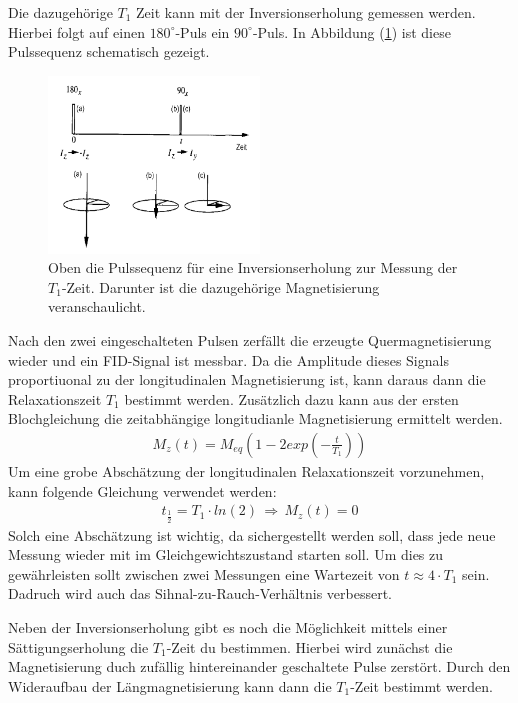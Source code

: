 Die dazugeh\"{o}rige $T_1$ Zeit kann mit der Inversionserholung gemessen werden.
Hierbei folgt auf einen $180^{\circ}$-Puls ein $90^{\circ}$-Puls.
In Abbildung (\ref{inversion}) ist diese Pulssequenz schematisch gezeigt.
\begin{figure}
	\centering
	\includegraphics[width=0.5\textwidth]{Plots/inversionserholung.png}
	\caption{Oben die Pulssequenz f\"{u}r eine Inversionserholung zur Messung der $T_1$-Zeit. Darunter ist die dazugeh\"{o}rige Magnetisierung veranschaulicht.}
	\label{inversion}
\end{figure}
Nach den zwei eingeschalteten Pulsen zerf\"{a}llt die erzeugte Quer{\-}mag{\-}ne{\-}ti{\-}sie{\-}rung wieder und ein FID-Signal ist messbar.
Da die Amplitude dieses Signals proportiuonal zu der longitudinalen Magnetisierung ist, kann daraus dann die Relaxationszeit $T_1$ bestimmt werden.
Zus\"{a}tzlich dazu kann aus der ersten Blochgleichung die zeitabh\"{a}ngige longitudianle Magnetisierung ermittelt werden.
\begin{align*}
	M_z(t) = M_{eq} \left(1 - 2 exp\left( - \frac{t}{T_1} \right) \right)
\end{align*}
Um eine grobe Absch\"{a}tzung der longitudinalen Relaxationszeit vorzunehmen, kann folgende Gleichung verwendet werden:
\begin{align*}
	t_{\frac{1}{2}} = T_1 \cdot ln(2) \, \Rightarrow \, M_z(t) = 0
\end{align*}
Solch eine Absch\"{a}tzung ist wichtig, da sichergestellt werden soll, dass jede neue Messung wieder mit im Gleichgewichtszustand starten soll.
Um dies zu gew\"{a}hrleisten sollt zwischen zwei Messungen eine Wartezeit von $t \approx 4 \cdot T_1$ sein.
Dadruch wird auch das Sihnal-zu-Rauch-Verh\"{a}ltnis verbessert.

Neben der Inversionserholung gibt es noch die M\"{o}glichkeit mittels einer S\"{a}ttigungs{\-}erhol{\-}ung die $T_1$-Zeit du bestimmen.
Hierbei wird zun\"{a}chst die Magnetisierung duch zuf\"{a}llig hintereinander geschaltete Pulse zerst\"{o}rt.
Durch den Wideraufbau der L\"{a}ngmagnetisierung kann dann die $T_1$-Zeit bestimmt werden.

